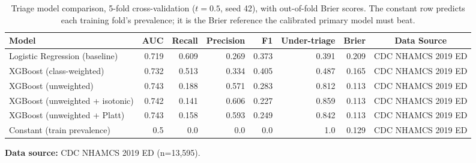 \begin{table}[t]
\centering
\caption{Triage model comparison, 5-fold cross-validation ($t=0.5$, seed 42), with out-of-fold Brier scores. The constant row predicts each training fold's prevalence; it is the Brier reference the calibrated primary model must beat.}
\label{tab:triage_models}
\begin{adjustbox}{max width=0.98\textwidth}
\begin{tabular}{lrrrrrrc}
\toprule
Model & AUC & Recall & Precision & F1 & Under-triage & Brier & Data Source \\
\midrule
Logistic Regression (baseline) & 0.719 & 0.609 & 0.269 & 0.373 & 0.391 & 0.209 & CDC NHAMCS 2019 ED \\
XGBoost (class-weighted) & 0.732 & 0.513 & 0.334 & 0.405 & 0.487 & 0.165 & CDC NHAMCS 2019 ED \\
XGBoost (unweighted) & 0.743 & 0.188 & 0.571 & 0.283 & 0.812 & 0.113 & CDC NHAMCS 2019 ED \\
XGBoost (unweighted + isotonic) & 0.742 & 0.141 & 0.606 & 0.227 & 0.859 & 0.113 & CDC NHAMCS 2019 ED \\
XGBoost (unweighted + Platt) & 0.743 & 0.158 & 0.593 & 0.249 & 0.842 & 0.113 & CDC NHAMCS 2019 ED \\
Constant (train prevalence) & 0.5 & 0.0 & 0.0 & 0.0 & 1.0 & 0.129 & CDC NHAMCS 2019 ED \\
\bottomrule
\end{tabular}
\end{adjustbox}
\par\vspace{2pt}\raggedright\footnotesize \textbf{Data source:} CDC NHAMCS 2019 ED (n=13,595).
\end{table}
